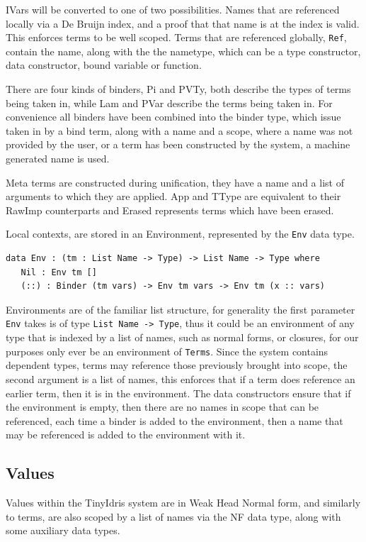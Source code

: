 \documentclass[a4paper]{article}
\begin{document}
IVars will be converted to one of two possibilities. Names that are
referenced locally via a De Bruijn index, and a proof that that name
is at the index is valid. This enforces terms to be well scoped. Terms 
that are referenced globally, \texttt{Ref}, contain the name, along with the the
nametype, which can be a type constructor, data constructor, bound 
variable or function. 

There are four kinds of binders, Pi and PVTy, both describe the types 
of terms being taken in, while Lam and PVar describe the terms being
taken in. For convenience all binders have been combined into the binder type, 
which issue taken in by a bind term, along with a name and a scope,
where a name was not provided by the user, or a term has been 
constructed by the system, a machine generated name is used. 

Meta terms are constructed during unification, they have a name and a
list of arguments to which they are applied. App and TType are 
equivalent to their RawImp counterparts and Erased represents
terms which have been erased.

Local contexts, are stored in an Environment, represented by the \texttt{Env}
data type.

\begin{center}
\begin{verbatim}
data Env : (tm : List Name -> Type) -> List Name -> Type where
   Nil : Env tm []
   (::) : Binder (tm vars) -> Env tm vars -> Env tm (x :: vars)
\end{verbatim}
\end{center}

Environments are of the familiar list structure, for generality the 
first parameter \texttt{Env} takes is of type \texttt{List Name -> Type}, thus it 
could be an environment of any type that is indexed by a list of names,
such as normal forms, or closures, for our purposes only ever be an 
environment of \texttt{Terms}. Since the system contains dependent types, 
terms may reference those previously brought into scope, the second
argument is a list of names, this enforces that if a term does 
reference an earlier term, then it is in the environment. The data 
constructors ensure that if the environment is empty, then there are 
no names in scope that can be referenced, each time a binder is added
to the environment, then a name that may be referenced is added to the 
environment with it.  

\subsection{Values}
\label{sec:org3d64566}
Values within the TinyIdris system are in Weak Head Normal form, and 
similarly to terms, are also scoped by a list of names via the NF data
type, along with some auxiliary data types. 
\end{document}
